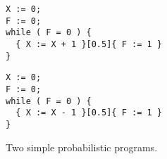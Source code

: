 \begin{figure}[t]
	\begin{minipage}[t]{0.5\textwidth}
		\begin{lstlisting}[label=prg:canonical, caption=Canonical example]
X := 0;
F := 0;
while ( F = 0 ) {
  { X := X + 1 }[0.5]{ F := 1 }
}
		\end{lstlisting}
	\end{minipage}
	\begin{minipage}[t]{0.5\textwidth}
		\begin{lstlisting}[label=prg:canonical_neg, caption=Inverse canonical example]
X := 0;
F := 0;
while ( F = 0 ) {
  { X := X - 1 }[0.5]{ F := 1 }
}
		\end{lstlisting}
	\end{minipage}
	\caption{Two simple probabilistic programs. \label{fig:canonicals}}
\end{figure}

